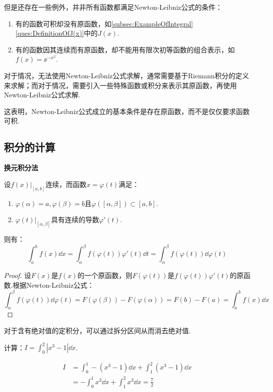 但是还存在一些例外，并非所有函数都满足Newton-Leibniz公式的条件：
\begin{enumerate}[circ]
    \item 有的函数可积却没有原函数，如\cref{subsec:ExampleOfIntegral}\cref{ques:DefinitionOfJ(x)}中的$J(x)$.
    \item 有的函数因其连续而有原函数，却不能用有限次初等函数的组合表示，如$f(x) = \ee^{-x^2}$.
\end{enumerate}
对于情况，无法使用Newton-Leibniz公式求解，通常需要基于Riemann积分的定义来求解；而对于情况，需要引入一些特殊函数或积分来表示其原函数，再使用Newton-Leibniz公式求解.

这表明，Newton-Leibniz公式成立的基本条件是存在原函数，而不是仅仅要求函数可积.


\subsection{积分的计算}
\begin{theorem}
    \textbf{换元积分法}

    设$\left.f(x)\right|_{[a,b]}$连续，而函数$x = \varphi(t)$满足：
    \begin{enumerate}[circ]
        \item $\varphi(\alpha) = a,\varphi(\beta) = b$且$\varphi([\alpha,\beta]) \subset [a,b]$.
        \item $\left.\varphi(t)\right|_{[\alpha,\beta]}$具有连续的导数$\varphi'(t)$.
    \end{enumerate}
    则有：
    \[\int_{a}^{b}f(x)\dd{x} = \int_{\alpha}^{\beta}f(\varphi(t))\varphi'(t)\dd{t} = \int_{\alpha}^{\beta}f(\varphi(t))\dd{\varphi(t)}\]
\end{theorem}

\begin{proof}
    设$F(x)$是$f(x)$的一个原函数，则$F(\varphi(t))$是$f(\varphi(t))\varphi'(t)$的原函数.根据Newton-Leibniz公式：
    \[\int_{\alpha}^{\beta}f(\varphi(t))\dd{\varphi(t)} = F(\varphi(\beta)) - F(\varphi(\alpha)) = F(b) - F(a) = \int_{a}^{b}f(x)\dd{x}\]
\end{proof}

对于含有绝对值的定积分，可以通过拆分区间从而消去绝对值.

\begin{question}
    计算：$\displaystyle I = \int_{0}^{2}|x^3-1|\dd{x}$.
\end{question}

\begin{solution}
    \begin{align*}
        I &= \int_{0}^{1}-(x^3-1)\dd{x} + \int_{1}^{2}(x^3-1)\dd{x} \\
        &= -\int_{0}^{1}x^3\dd{x} + \int_{1}^{2}x^3\dd{x} = \frac{7}{2}
    \end{align*}
\end{solution}

